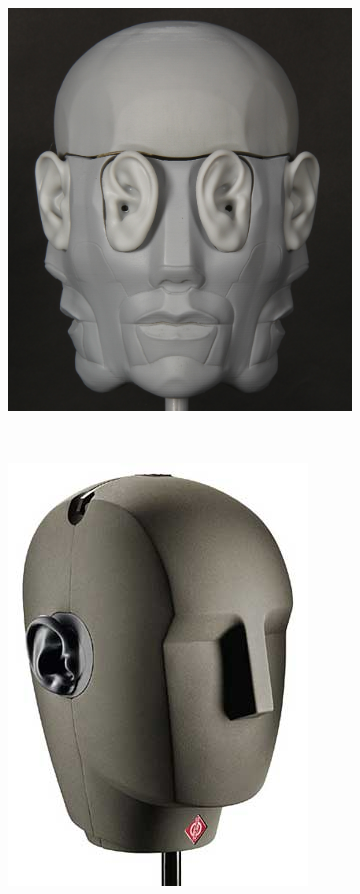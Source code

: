 \documentclass[a4,12pt]{scrartcl}
\begin{document}
\begin{figure}[H]
	\centering
	\begin{subfigure}{.3\linewidth}
	  \centering
	  \includegraphics[width=\linewidth]{binaural-3d-microphone-head}
	\end{subfigure}
	~
	\begin{subfigure}{.3\linewidth}
	  \centering
	  \includegraphics[width=0.8\linewidth]{ku-100}

\end{subfigure}
\end{figure}
\end{document}
